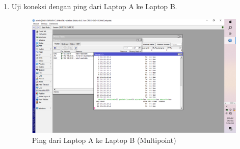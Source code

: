 \begin{enumerate}
    \item Uji koneksi dengan ping dari Laptop A ke Laptop B.
    \begin{figure}[H]
        \centering
        \includegraphics[width=0.5\linewidth]{ping2.png}
        \caption{Ping dari Laptop A ke Laptop B (Multipoint)}
        \label{fig:ping-multi}
    \end{figure}
\end{enumerate}

